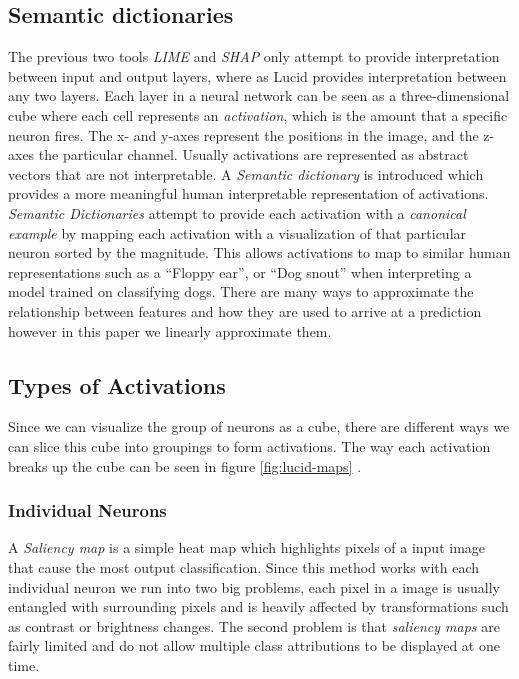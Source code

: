 \subsection{Semantic dictionaries}
The previous two tools \emph{LIME} and \emph{SHAP} only attempt to provide interpretation  between input and output layers, where as Lucid provides interpretation between any two layers. Each layer in a neural network can be seen as a three-dimensional cube where each cell represents an \emph{activation}, which is the amount that a specific neuron fires. The x- and y-axes represent the positions in the image, and the z-axes the particular channel. Usually activations are represented as abstract vectors that are not interpretable. A \emph{Semantic dictionary} is introduced which provides a more meaningful human interpretable representation of activations. \emph{Semantic Dictionaries} attempt to provide each activation with a \emph{canonical example} by mapping each activation with a visualization of that particular neuron sorted by the magnitude. This allows activations to map to similar human representations such as a ``Floppy ear'', or ``Dog snout'' when interpreting a model trained on classifying dogs. There are many ways to approximate the relationship between features and how they are used to arrive at a prediction however in this paper we linearly approximate them. 

\subsection{Types of Activations}
Since we can visualize the group of neurons as a cube, there are different ways we can slice this cube into groupings to form activations. The way each activation breaks up the cube can be seen in figure \ref{fig:lucid-maps}
.
\subsubsection{Individual Neurons}
A \emph{Saliency map} is a simple heat map which highlights pixels of a input image that cause the most output classification. Since this method works with each individual neuron we run into two big problems, each pixel in a image is usually entangled with surrounding pixels and is heavily affected by transformations such as contrast or brightness changes. The second problem is that \emph{saliency maps} are fairly limited and do not allow multiple class attributions to be displayed at one time.

